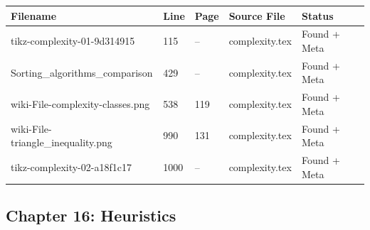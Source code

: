 \documentclass[11pt]{article}
\begin{document}
\begin{longtable}{|p{3.5cm}|p{1.5cm}|p{1cm}|p{4cm}|p{2cm}|}
\hline
\textbf{Filename} & \textbf{Line} & \textbf{Page} & \textbf{Source File} & \textbf{Status} \\
\hline
\endhead

tikz-complexity-01-9d314915 & 115 & -- & complexity.tex & \textcolor{found}{Found + Meta} \\
\hline

Sorting\_algorithms\_comparison & 429 & -- & complexity.tex & \textcolor{found}{Found + Meta} \\
\hline

wiki-File-complexity-classes.png & 538 & 119 & complexity.tex & \textcolor{found}{Found + Meta} \\
\hline

wiki-File-triangle\_inequality.png & 990 & 131 & complexity.tex & \textcolor{found}{Found + Meta} \\
\hline

tikz-complexity-02-a18f1c17 & 1000 & -- & complexity.tex & \textcolor{found}{Found + Meta} \\
\hline

\end{longtable}


\subsection{Chapter 16: Heuristics}
\end{document}
